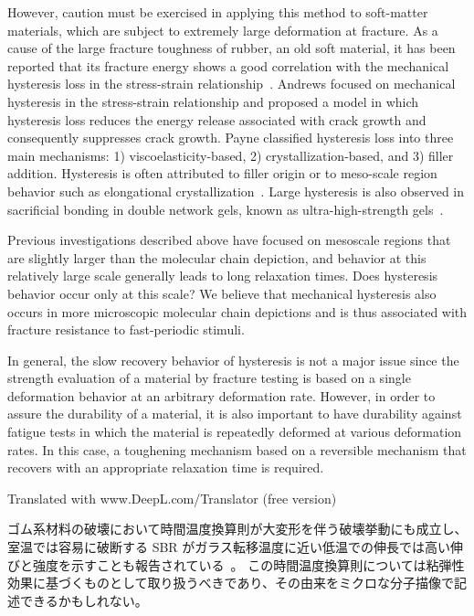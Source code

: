 \documentclass[uplatex,dvipdfmx,a4paper,10pt]{jsarticle}
\makeatletter
\def\subsection{\@startsection{subsection}{2}{\z@}{0.2\Cvs \@plus.5\Cdp \@minus.2\Cdp}{0.1\Cvs \@plus.3\Cdp}{\reset@font\normalsize\bfseries}}
\makeatother
\begin{document}
However, caution must be exercised in applying this method to soft-matter materials, which are subject to extremely large deformation at fracture.
As a cause of the large fracture toughness of rubber, an old soft material, it has been reported that its fracture energy shows a good correlation with the mechanical hysteresis loss in the stress-strain relationship~\cite{payne1}.
Andrews focused on mechanical hysteresis in the stress-strain relationship and proposed a model in which hysteresis loss reduces the energy release associated with crack growth and consequently suppresses crack growth.
Payne classified hysteresis loss into three main mechanisms: 1) viscoelasticity-based, 2) crystallization-based, and 3) filler addition.
Hysteresis is often attributed to filler origin or to meso-scale region behavior such as elongational crystallization~\cite{zhang, Igarashi2013}.
Large hysteresis is also observed in sacrificial bonding in double network gels, known as ultra-high-strength gels~\cite{Gong2010}.

Previous investigations described above have focused on mesoscale regions that are slightly larger than the molecular chain depiction, and behavior at this relatively large scale generally leads to long relaxation times.
Does hysteresis behavior occur only at this scale?
We believe that mechanical hysteresis also occurs in more microscopic molecular chain depictions and is thus associated with fracture resistance to fast-periodic stimuli.

In general, the slow recovery behavior of hysteresis is not a major issue since the strength evaluation of a material by fracture testing is based on a single deformation behavior at an arbitrary deformation rate.
However, in order to assure the durability of a material, it is also important to have durability against fatigue tests in which the material is repeatedly deformed at various deformation rates.
In this case, a toughening mechanism based on a reversible mechanism that recovers with an appropriate relaxation time is required.

Translated with www.DeepL.com/Translator (free version)

\subsection{破壊にたいする粘弾性効果}
ゴム系材料の破壊において時間温度換算則が大変形を伴う破壊挙動にも成立し、室温では容易に破断する SBR がガラス転移温度に近い低温での伸長では高い伸びと強度を示すことも報告されている~\cite{smith}。
この時間温度換算則については粘弾性効果に基づくものとして取り扱うべきであり、その由来をミクロな分子描像で記述できるかもしれない。
\end{document}
